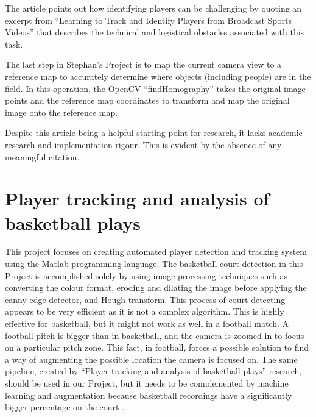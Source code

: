 \documentclass[
11pt,
twoside
]{report}
\begin{document}
The article points out how identifying players can be challenging by quoting an excerpt from ``Learning to Track and Identify Players from Broadcast Sports Videos'' \cite{learn_track_id} that describes the technical and logistical obstacles associated with this task.


The last step in Stephan's Project is to map the current camera view to a reference map to accurately determine where objects (including people) are in the field. In this operation, the OpenCV \cite{opencv} ``findHomography'' takes the original image points and the reference map coordinates to transform and map the original image onto the reference map.


Despite this article being a helpful starting point for research, it lacks academic research and implementation rigour. This is evident by the absence of any meaningful citation.


\section{Player tracking and analysis of basketball plays}

This project \cite{baskettrack} focuses on creating automated player detection and tracking system using the Matlab programming language. The basketball court detection in this Project is accomplished solely by using image processing techniques such as converting the colour format, eroding and dilating the image before applying the canny edge detector, and Hough transform. This process of court detecting appears to be very efficient as it is not a complex algorithm. This is highly effective for basketball, but it might not work as well in a football match. A football pitch is bigger than in basketball, and the camera is zoomed in to focus on a particular pitch zone. This fact, in football, forces a possible solution to find a way of augmenting the possible location the camera is focused on. The same pipeline, created by ``Player tracking and analysis of basketball plays'' research, should be used in our Project, but it needs to be complemented by machine learning and augmentation because basketball recordings have a significantly bigger percentage on the court \cite{baskettrack}.
\end{document}
